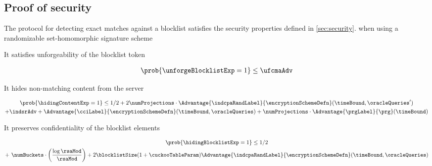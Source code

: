 \subsection{Proof of security \protocolFMP}
\label{sec:proof:fmp}
%
\begin{theorem}
	
	The protocol \protocolFMP for detecting exact matches against a blocklist satisfies the security properties defined in \ref{sec:security}.
when using a randomizable set-homomorphic signature scheme \ourSigSchemeDefn 

\enumListStart
	
	\item It satisfies unforgeability of the blocklist token 
	\begin{small}
	\begin{gather*}
    \prob{\unforgeBlocklistExp = 1} \le \ufcmaAdv
\end{gather*}
	\end{small}
	
	\item It hides non-matching content from the server 
	
	\begin{small}
					\begin{gather*}
			\prob{\hidingContentExp = 1} \le 1/2 + 2 \numProjections \cdot \Advantage{\indcpaRandLabel}{\encryptionSchemeDefn}(\timeBound, 
		\oracleQueries') \\  + \indsrAdv +  \Advantage{\cciLabel}{\encryptionSchemeDefn}(\timeBound, \oracleQueries)  + \numProjections \cdot \Advantage{\prgLabel}{\prg}(\timeBound)
		\end{gather*}
		\end{small}
	
	\item It preserves confidentiality of the blocklist elements
	
	\begin{small}
				\begin{gather*}
				\prob{\hidingBlocklistExp = 1} \le 1/2  \\ + ~\numBuckets \cdot \left(\frac{\log \rsaMod}{\rsaMod}\right) + 2 \blocklistSize (1 +  \cuckooTableParam)\Advantage{\indcpaRandLabel}{\encryptionSchemeDefn}(\timeBound, \oracleQueries)
			\end{gather*}
		\end{small}
	
	\enumListEnd  


\end{theorem}



